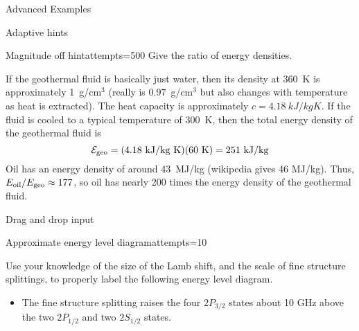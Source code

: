 \begin{edXchapter}{Advanced Examples}
\begin{edXsection}{Adaptive hints}
\begin{edXvertical}
\begin{edXproblem}{Magnitude off hint}{attempts=500}
Give the ratio of energy densities.

  
 
\begin{edXsolution}

  If the geothermal fluid is basically just water, then its density at
  360~K is approximately 1~g/cm$^3$ (really is 0.97~g/cm$^3$ but also
  changes with temperature as heat is extracted). The heat capacity is
  approximately $c = 4.18~kJ/kg K$. If the fluid is cooled to a
  typical temperature of 300~K, then the total energy density of the
  geothermal fluid is
\begin{equation}
\mathcal{E}_{\rm geo} = \rm(4.18~kJ/kg~K)(60~K) = 251~kJ/kg
\end{equation}
Oil has an energy density of around 43~MJ/kg (wikipedia gives 46
MJ/kg).  Thus, $E_{\rm oil}/E_{\rm geo} \approx 177$, so oil has
nearly 200 times the energy density of the geothermal fluid.  

\end{edXsolution}

\end{edXproblem}


\end{edXvertical}

\end{edXsection}


\begin{edXsection}{Drag and drop input}

\begin{edXvertical}

\begin{edXproblem}{Approximate energy level diagram}{attempts=10}

Use your knowledge of the size of the Lamb shift, and the scale of fine
structure splittings, to properly label the following energy level diagram.


\begin{edXsolution}

\begin{itemize}

\item The fine structure splitting raises the four $2P_{3/2}$ states about
10 GHz above the two $2P_{1/2}$ and two $2S_{1/2}$ states.


\end{itemize}
\end{edXsolution}
\end{edXproblem}
\end{edXvertical}
\end{edXsection}
\end{edXchapter}
